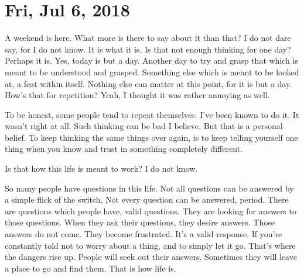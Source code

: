 \section{Fri, Jul 6, 2018}

A weekend is here. What more is there to say about it than that? I do not dare
say, for I do not know. It is what it is. Is that not enough thinking for one
day? Perhaps it is. Yes, today is but a day. Another day to try and grasp that
which is meant to be understood and grasped. Something else which is meant to be
looked at, a feat within itself. Nothing else can matter at this point, for it
is but a day. How's that for repetition? Yeah, I thought it was rather annoying
as well.

To be honest, some people tend to repeat themselves. I've been known to do it.
It wasn't right at all. Such thinking can be bad I believe. But that is a
personal belief. To keep thinking the same things over again, is to keep telling
yourself one thing when you know and trust in something completely different.

Is that how this life is meant to work? I do not know.

So many people have questions in this life. Not all questions can be answered by
a simple flick of the switch. Not every question can be answered, period. There
are questions which people have, valid questions. They are looking for answers
to those questions. When they ask their questions, they desire answers. Those
answers do not come. They become frustrated. It's a valid response. If you're
constantly told not to worry about a thing, and to simply let it go. That's
where the dangers rise up. People will seek out their answers. Sometimes they
will leave a place to go and find them. That is how life is.

